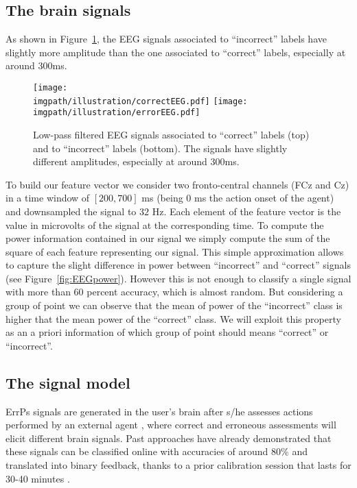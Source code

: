 \subsection{The brain signals}

As shown in Figure~\ref{fig:EEGsample}, the EEG signals associated to ``incorrect'' labels have slightly more amplitude than the one associated to ``correct'' labels, especially at around 300ms.

\begin{figure}[!htbp]
\centering
\texttt{[image: \\imgpath/illustration/correctEEG.pdf]}
\texttt{[image: \\imgpath/illustration/errorEEG.pdf]}
\caption{Low-pass filtered EEG signals associated to ``correct'' labels (top) and to ``incorrect'' labels (bottom).  The signals have slightly different amplitudes, especially at around 300ms. }
\label{fig:EEGsample}
\end{figure}

To build our feature vector we consider two fronto-central channels (FCz and Cz) in a time window of $[200,700]$ ms (being 0 ms the action onset of the agent) and downsampled the signal to $32$ Hz. Each element of the feature vector is the value in microvolts of the signal at the corresponding time. To compute the power information contained in our signal we simply compute the sum of the square of each feature representing our signal. This simple approximation allows to capture the slight difference in power between ``incorrect'' and ``correct'' signals (see Figure~\ref{fig:EEGpower}). However this is not enough to classify a single signal with more than 60 percent accuracy, which is almost random. But considering a group of point we can observe that the mean of power of the ``incorrect'' class is higher that the mean power of the ``correct'' class. We will exploit this property as an a priori information of which group of point should means ``correct'' or ``incorrect''.

\subsection{The signal model}

ErrPs signals are generated in the user's brain after s/he assesses actions performed by an external agent \cite{chavarriaga2010learning}, where correct and erroneous assessments will elicit different brain signals. Past approaches have already demonstrated that these signals can be classified online with accuracies of around 80\% and translated into binary feedback, thanks to a prior calibration session that lasts for 30-40 minutes \cite{chavarriaga2010learning, iturrate2013task}.

